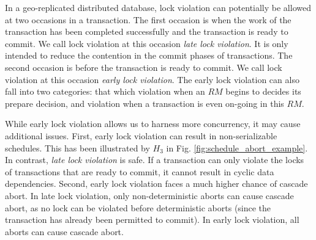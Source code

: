 \documentclass[conference]{IEEEtran}
\begin{document}
In a geo-replicated distributed database, lock violation can potentially be allowed at two occasions in a transaction.
The first occasion is when the work of the transaction has been completed successfully and the transaction is ready to commit.
We call lock violation at this occasion \emph{late lock violation}. It is only intended to reduce the contention in the commit phases of transactions.
The second occasion is before the transaction is ready to commit. We call lock violation at this occasion \emph{early lock violation}. 
The early lock violation can also fall into two categories: 
that which violation when an ${RM}$ begins to decides its prepare decision, 
and violation when a transaction is even on-going in this ${RM}$. 


While early lock violation allows us to harness more concurrency, it may cause additional issues. 
First, early lock violation can result in non-serializable schedules. This has been illustrated by ${H_3}$ in Fig.   \ref{fig:schedule_abort_example}.
In contrast, \emph{late lock violation} is safe. If a transaction can only violate the locks of transactions that are ready to commit, it cannot result in cyclic data dependencies.
Second, early lock violation faces a much higher chance of cascade abort. In late lock violation, only non-deterministic aborts can cause cascade abort, as no lock can be violated before deterministic aborts (since the transaction has already been permitted to commit). In early lock violation, all aborts can cause cascade abort.
\end{document}
